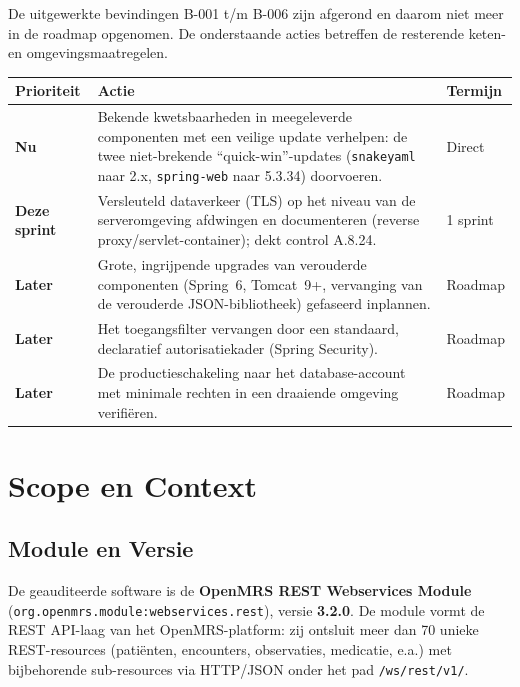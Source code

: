 \documentclass[12pt, a4paper]{report}
\begin{document}
De uitgewerkte bevindingen B-001 t/m B-006 zijn afgerond en daarom niet meer in
de roadmap opgenomen. De onderstaande acties betreffen de resterende
keten- en omgevingsmaatregelen.

{\small
\begin{tabularx}{\textwidth}{@{}l X l@{}}
    \toprule
    \textbf{Prioriteit} & \textbf{Actie} & \textbf{Termijn} \\
    \midrule
    \textbf{Nu} & Bekende kwetsbaarheden in meegeleverde componenten met een
                  veilige update verhelpen: de twee niet-brekende
                  ``quick-win''-updates (\texttt{snakeyaml} naar 2.x,
                  \texttt{spring-web} naar 5.3.34) doorvoeren. & Direct \\
    \addlinespace
    \textbf{Deze sprint} & Versleuteld dataverkeer (TLS) op het niveau van de
                  serveromgeving afdwingen en documenteren (reverse
                  proxy/servlet-container); dekt control A.8.24. & 1 sprint \\
    \addlinespace
    \textbf{Later} & Grote, ingrijpende upgrades van verouderde componenten
                  (Spring~6, Tomcat~9+, vervanging van de verouderde
                  JSON-bibliotheek) gefaseerd inplannen. & Roadmap \\
    \addlinespace
    \textbf{Later} & Het toegangsfilter vervangen door een standaard,
                  declaratief autorisatiekader (Spring Security). & Roadmap \\
    \addlinespace
    \textbf{Later} & De productieschakeling naar het database-account met
                  minimale rechten in een draaiende omgeving verifiëren. & Roadmap \\
    \bottomrule
\end{tabularx}
}

\newpage

\chapter{Scope en Context}
\label{ch:scope}

\section{Module en Versie}
\label{sec:module-versie}

De geauditeerde software is de \textbf{OpenMRS REST Webservices Module}
(\texttt{org.openmrs.module:webservices.rest}), versie \textbf{3.2.0}.
De module vormt de REST API-laag van het OpenMRS-platform: zij ontsluit
meer dan 70 unieke REST-resources (patiënten, encounters, observaties,
medicatie, e.a.) met bijbehorende sub-resources via HTTP/JSON onder het pad \texttt{/ws/rest/v1/}.
\end{document}
